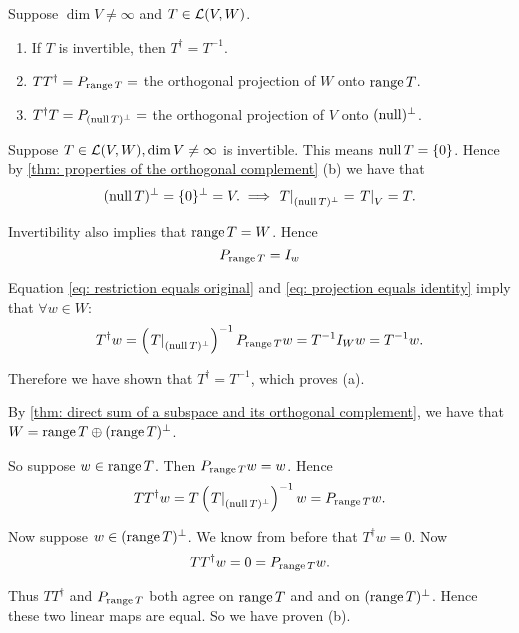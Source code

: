 \begin{thm} 
  \label{thm: algebraic properties of the pseudoinverse}
  Suppose $\dim V \neq \infty$ and $T\in \mathcal{L}(V,W)$.
  \begin{enumerate}[label=(\alph*)]
    \item If $T$ is invertible, then $T^\dagger = T^{-1}$.
    \item $T T^\dagger = P_{\operatorname{range} T} =$ the orthogonal projection of $W$ onto $\operatorname{range} T$.
    \item $T^\dagger T = P_{(\operatorname{null} T)^\bot} =$ the orthogonal projection of $V$ onto $(\operatorname{null})^\bot$.
  \end{enumerate}
\end{thm}
\begin{prf}
  Suppose $T \in \mathcal{L}(V,W), \dim V \neq \infty$ is invertible. This means $\operatorname{null} T = \{0\}$. Hence by \ref{thm: properties of the orthogonal complement} (b) we have that
  \begin{equation}
      \label{eq: restriction equals original}
      (\operatorname{null} T)^\bot = \{0\}^\bot = V. \implies \left. T \right |_{(\operatorname{null} T)^\bot} = \left. T \right|_V= T.
  \end{equation}

  Invertibility also implies that $\operatorname{range} T = W$. Hence
  \begin{equation}
    \label{eq: projection equals identity}
    P_{\operatorname{range} T} = I_w
  \end{equation}


  Equation \eqref{eq: restriction equals original} and \eqref{eq: projection equals identity} imply that $\forall w \in W:$
  \[
    T^\dagger w = \left( \left. T \right|_{(\operatorname{null} T)^\bot} \right)^{-1} P_{\operatorname{range} T} w = T^{-1} I_W w = T^{-1} w.
  \]

  Therefore we have shown that $T^\dagger = T^{-1}$, which proves (a).

   By \eqref{thm: direct sum of a subspace and its orthogonal complement}, we have that $W= \operatorname{range} T \oplus (\operatorname{range} T)^\bot$.

  So suppose $w \in \operatorname{range} T$. Then $P_{\operatorname{range} T} w=w$. Hence
  \[
    T T^\dagger w = T \left( \left. T \right|_{(\operatorname{null} T)^\bot} \right)^{-1} w = P_{\operatorname{range} T} w.
  \]

  Now suppose $w \in (\operatorname{range} T)^\bot$. We know from before that $T^\dagger w = 0$. Now
  \[
    T T^\dagger w = 0 = P_{\operatorname{range} T} w.
  \]

  Thus $TT^\dagger$ and $P_{\operatorname{range} T}$ both agree on $\operatorname{range} T$ and and on $(\operatorname{range} T)^\bot$.  Hence these two linear maps are equal. So we have proven (b).


\end{prf}
